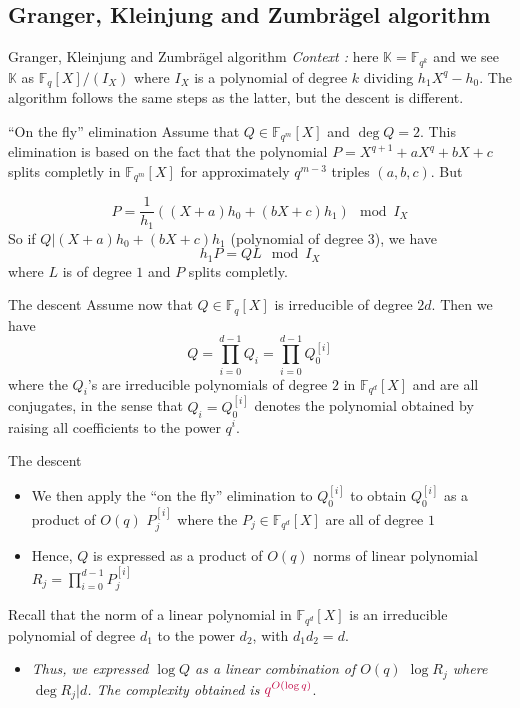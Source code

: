 \documentclass[xcolor=x11names,compress]{beamer}
\theoremstyle{break}
\theoremstyle{sc}
\theoremstyle{definition}
\theoremstyle{remark}
\begin{document}
\subsection{Granger, Kleinjung and Zumbrägel algorithm}

\begin{frame}{Granger, Kleinjung and Zumbrägel algorithm}
  \emph{Context :} here $\mathbb{K}=\mathbb{F}_{q^k}$ and we see $\mathbb{K}$ as
  $\mathbb{F}_q[X]/(I_X)$ where $I_X$ is a polynomial of degree $k$ dividing
  $h_1X^q-h_0$. The algorithm follows the same steps as the latter, but the
  descent is different.
\end{frame}

\begin{frame}{``On the fly'' elimination}
  Assume that $Q\in \mathbb{F}_{q^m}[X]$ and $\deg Q = 2$. This elimination is
  based on the fact that the polynomial $P = X^{q+1}+aX^q+bX+c$ splits completly
  in $\mathbb{F}_{q^m}[X]$ for approximately $q^{m-3}$ triples $(a, b, c)$. But
  
  \[
    P = \frac{1}{h_1}((X+a)h_0 + (bX+c)h_1)\mod I_X
  \]
  So if $Q| (X+a)h_0 + (bX+c)h_1$ (polynomial of degree $3$), we have 
  \[
    h_1P=QL \mod I_X
  \]
  where $L$ is of degree $1$ and $P$ splits completly.

\end{frame}

\begin{frame}{The descent}
  Assume now that $Q\in\mathbb{F}_{q}[X]$ is irreducible of degree $2d$. Then we
  have
  \[
    Q=\prod_{i=0}^{d-1} Q_i = \prod_{i=0}^{d-1}Q_0^{[i]}
  \]
  where the $Q_i$'s are irreducible polynomials of degree $2$ in
  $\mathbb{F}_{q^d}[X]$ and are all conjugates, in the sense that
  $Q_i=Q_0^{[i]}$ denotes the polynomial obtained by raising all coefficients to
  the power $q^i$.
\end{frame}
  
\begin{frame}{The descent}
  \begin{itemize}
    \item We then apply the ``on the fly''
      elimination to $Q_0^{[i]}$ to obtain $Q_0^{[i]}$ as a product of 
      $O(q)$ $P_j^{[i]}$ where the $P_j\in \mathbb{F}_{q^d}[X]$ are all of degree $1$
    \item Hence, $Q$ is expressed as a product of $O(q)$ norms of linear polynomial
      $R_j=\prod_{i=0}^{d-1}P_j^{[i]}$
  \end{itemize}
  
  Recall that the norm of a linear polynomial in $\mathbb{F}_{q^d}[X]$ is an irreducible
  polynomial of degree $d_1$ to the power $d_2$, with $d_1d_2 = d$.
  \begin{itemize}
    \item \emph{Thus, we expressed $\log Q$ as a linear combination of $O(q)$ $\log
        R_j$ where $\deg R_j | d$. The complexity obtained is
        $\textcolor{purple}{q^{O(\log q)}}$}.
  \end{itemize}
\end{frame}

\end{document}

